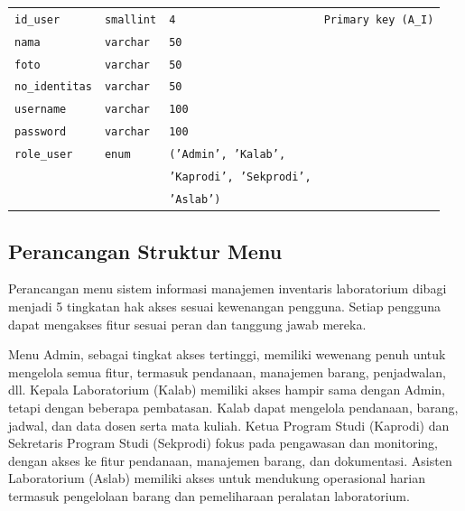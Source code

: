 \begin{enumerate}
{\begin{longtable}{p{3 cm} p{3cm} p{3 cm} p{3.4 cm}}
				      \texttt{id\_user}       & \texttt{smallint}      & \texttt{4}                      & \texttt{Primary key (A\_I)} \\
				      \texttt{nama}           & \texttt{varchar}       & \texttt{50}                     &                             \\
				      \texttt{foto}           & \texttt{varchar}       & \texttt{50}                     &                             \\
				      \texttt{no\_identitas}  & \texttt{varchar}       & \texttt{50}                     &                             \\
				      \texttt{username}       & \texttt{varchar}       & \texttt{100}                    &                             \\
				      \texttt{password}       & \texttt{varchar}       & \texttt{100}                    &                             \\
				      \texttt{role\_user}     & \texttt{enum}          & \texttt{('Admin', 'Kalab',}     &                             \\
				                              &                        & \texttt{'Kaprodi', 'Sekprodi',} &                             \\
				                              &                        & \texttt{'Aslab')}               &                             \\
				      \hline
			      \end{longtable}
		      }

\end{enumerate}

\subsection{Perancangan Struktur Menu}
Perancangan menu sistem informasi manajemen inventaris laboratorium dibagi menjadi 5 tingkatan hak akses sesuai kewenangan pengguna. Setiap pengguna dapat mengakses fitur sesuai peran dan tanggung jawab mereka.

Menu Admin, sebagai tingkat akses tertinggi, memiliki wewenang penuh untuk mengelola semua fitur, termasuk pendanaan, manajemen barang, penjadwalan, dll. Kepala Laboratorium (Kalab) memiliki akses hampir sama dengan Admin, tetapi dengan beberapa pembatasan. Kalab dapat mengelola pendanaan, barang, jadwal, dan data dosen serta mata kuliah. Ketua Program Studi (Kaprodi) dan Sekretaris Program Studi (Sekprodi) fokus pada pengawasan dan monitoring, dengan akses ke fitur pendanaan, manajemen barang, dan dokumentasi. Asisten Laboratorium (Aslab) memiliki akses untuk mendukung operasional harian termasuk pengelolaan barang dan pemeliharaan peralatan laboratorium.

